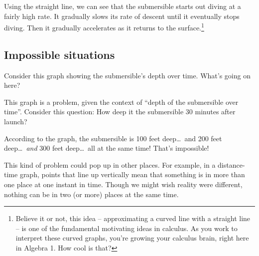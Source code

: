 Using the straight line, we can see that the submersible starts out diving at a fairly high rate. It gradually slows its rate of descent until it eventually stops diving. Then it gradually accelerates as it returns to the surface.\footnote{Believe it or not, this idea -- approximating a curved line with a straight line -- is one of the fundamental motivating ideas in calculus. As you work to interpret these curved graphs, you're growing your calculus brain, right here in Algebra 1. How cool is that?}

\subsection{Impossible situations}

Consider this graph showing the submersible's depth over time. What's going on here?

\begin{figure}
\end{figure}

This graph is a problem, given the context of ``depth of the submersible over time''. Consider this question: How deep it the submersible 30 minutes after launch?

According to the graph, the submersible is 100 feet deep\ldots\ and 200 feet deep\ldots\ \textit{and} 300 feet deep\ldots\ all at the same time! That's impossible!

This kind of problem could pop up in other places. For example, in a distance-time graph, points that line up vertically mean that something is in more than one place at one instant in time. Though we might wish reality were different, nothing can be in two (or more) places at the same time.

